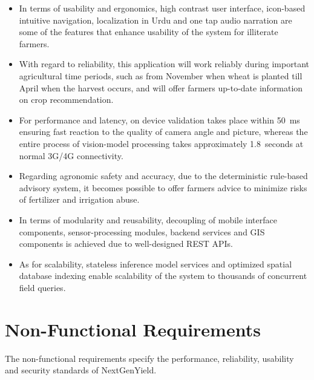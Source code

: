 \documentclass{FastFyp}
\begin{document}
\begin{itemize}
    \item In terms of usability and ergonomics, high contrast user interface,
    icon-based intuitive navigation, localization in Urdu and one tap audio
    narration are some of the features that enhance usability of the system
    for illiterate farmers.

    \item With regard to reliability, this application will work reliably
    during important agricultural time periods, such as from November when
    wheat is planted till April when the harvest occurs, and will offer
    farmers up-to-date information on crop recommendation.

    \item For performance and latency, on device validation takes place within
    50~ms ensuring fast reaction to the quality of camera angle and picture,
    whereas the entire process of vision-model processing takes approximately
    1.8~seconds at normal 3G/4G connectivity.

    \item Regarding agronomic safety and accuracy, due to the deterministic
    rule-based advisory system, it becomes possible to offer farmers advice
    to minimize risks of fertilizer and irrigation abuse.

    \item In terms of modularity and reusability, decoupling of mobile
    interface components, sensor-processing modules, backend services and GIS
    components is achieved due to well-designed REST APIs.

    \item As for scalability, stateless inference model services and optimized
    spatial database indexing enable scalability of the system to thousands of
    concurrent field queries.
\end{itemize}

 


\section{Non-Functional Requirements}
The non-functional requirements specify the performance, reliability, usability and security standards of NextGenYield.
\end{document}
